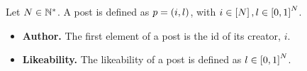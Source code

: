 \begin{definition}[Post]
  Let $N \in \mathbb{N}^*$. A post is defined as $p = \left(i,
  l\right)$, with $i \in \left[N\right], l \in \left[0,
  1\right]^N$.
  \begin{itemize}
    \item \textbf{Author.} The first element of a post is the id of its creator,
    $i$.

    \item \textbf{Likeability.} The likeability of a post is defined as
    $l \in \left[0, 1\right]^N$.
  \end{itemize}
\end{definition}
